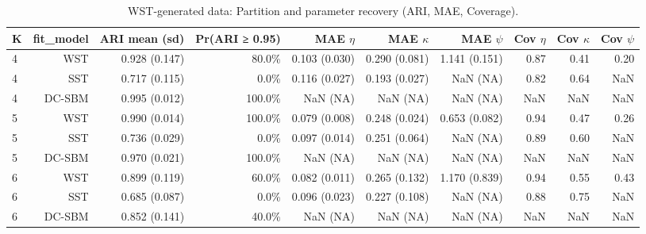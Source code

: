 \begin{table}[!h]
\centering
\caption{WST-generated data: Partition and parameter recovery (ARI, MAE, Coverage).\\\label{tab:wst-main-partition-params}}
\centering
\begin{tabular}[t]{lrrrrrrrrr}
\toprule
K & fit_model & ARI mean (sd) & Pr(ARI ≥ 0.95) & MAE $\eta$ & MAE $\kappa$ & MAE $\psi$ & Cov $\eta$ & Cov $\kappa$ & Cov $\psi$\\
\midrule
4 & WST & 0.928 (0.147) & 80.0\% & 0.103 (0.030) & 0.290 (0.081) & 1.141 (0.151) & 0.87 & 0.41 & 0.20\\
4 & SST & 0.717 (0.115) & 0.0\% & 0.116 (0.027) & 0.193 (0.027) & NaN (NA) & 0.82 & 0.64 & NaN\\
4 & DC-SBM & 0.995 (0.012) & 100.0\% & NaN (NA) & NaN (NA) & NaN (NA) & NaN & NaN & NaN\\
5 & WST & 0.990 (0.014) & 100.0\% & 0.079 (0.008) & 0.248 (0.024) & 0.653 (0.082) & 0.94 & 0.47 & 0.26\\
5 & SST & 0.736 (0.029) & 0.0\% & 0.097 (0.014) & 0.251 (0.064) & NaN (NA) & 0.89 & 0.60 & NaN\\
5 & DC-SBM & 0.970 (0.021) & 100.0\% & NaN (NA) & NaN (NA) & NaN (NA) & NaN & NaN & NaN\\
6 & WST & 0.899 (0.119) & 60.0\% & 0.082 (0.011) & 0.265 (0.132) & 1.170 (0.839) & 0.94 & 0.55 & 0.43\\
6 & SST & 0.685 (0.087) & 0.0\% & 0.096 (0.023) & 0.227 (0.108) & NaN (NA) & 0.88 & 0.75 & NaN\\
6 & DC-SBM & 0.852 (0.141) & 40.0\% & NaN (NA) & NaN (NA) & NaN (NA) & NaN & NaN & NaN\\
\bottomrule
\end{tabular}
\end{table}

